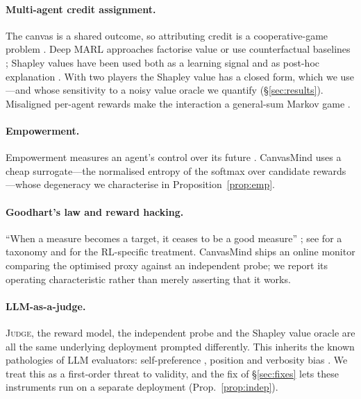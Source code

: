 \documentclass[11pt]{article}
\newcommand{\JUDGE}{\textsc{Judge}}
\theoremstyle{plain}
\theoremstyle{definition}
\begin{document}
\paragraph{Multi-agent credit assignment.}
The canvas is a shared outcome, so attributing credit is a cooperative-game
problem \citep{shapley1953value}. Deep MARL approaches factorise value
\citep{sunehag2018value,rashid2018qmix} or use counterfactual baselines
\citep{foerster2018counterfactual}; Shapley values have been used both as a
learning signal \citep{wang2020shapley} and as post-hoc explanation
\citep{heuillet2022collective}. With two players the Shapley value has a closed
form, which we use---and whose sensitivity to a noisy value oracle we quantify
(\S\ref{sec:results}). Misaligned per-agent rewards make the interaction a
general-sum Markov game \citep{littman1994markov,lowe2017multi}.

\paragraph{Empowerment.}
Empowerment measures an agent's control over its future
\citep{klyubin2005empowerment,salge2014empowerment,mohamed2015variational}.
CanvasMind uses a cheap surrogate---the normalised entropy of the softmax over
candidate rewards---whose degeneracy we characterise in
Proposition~\ref{prop:emp}.

\paragraph{Goodhart's law and reward hacking.}
``When a measure becomes a target, it ceases to be a good measure''
\citep{goodhart1984problems,strathern1997improving}; see
\citet{manheim2018categorizing} for a taxonomy and
\citet{amodei2016concrete,skalse2022defining,pan2022effects,casper2023open} for
the RL-specific treatment. CanvasMind ships an online monitor comparing the
optimised proxy against an independent probe; we report its operating
characteristic rather than merely asserting that it works.

\paragraph{LLM-as-a-judge.}
\JUDGE{}, the reward model, the independent probe and the Shapley value oracle
are all the same underlying deployment prompted differently. This inherits the
known pathologies of LLM evaluators: self-preference
\citep{panickssery2024llm}, position and verbosity bias
\citep{wang2024large,zheng2023judging}. We treat this as a first-order threat to
validity, and the fix of \S\ref{sec:fixes} lets these instruments run on a
separate deployment (Prop.~\ref{prop:indep}).
\end{document}
